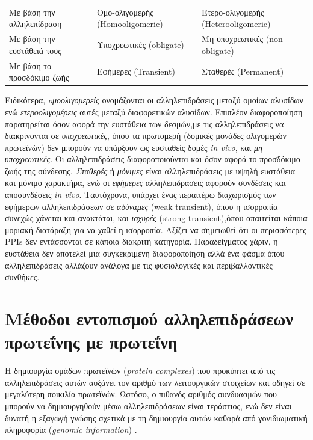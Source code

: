 \medskip
\begingroup
\begin{tabularx}{0.8\textwidth} { 
  | >{\raggedright\arraybackslash}X 
  | >{\centering\arraybackslash}X 
  | >{\raggedleft\arraybackslash}X | }
  \hline
 \multicolumn{3}{|c|}{Τύποι Αλληλεπιδράσεων Πρωτεΐνης με Πρωτεΐνη} \\
 \hline
    Με βάση την αλληλεπίδραση & Ομο-ολιγομερής (Homooligomeric) & Ετερο-ολιγομερής (Heterooligomeric)\\
 \hline
    Με βάση την ευστάθειά τους & Υποχρεωτικές (obligate) & Μη υποχρεωτικές (non obligate) \\
 \hline
    Με βάση το προσδόκιμο ζωής & Εφήμερες (Transient) & Σταθερές (Permanent) \\
 \hline
\end{tabularx}
\label{Τύποι Αλληλεπιδράσεων Πρωτεΐνης με Πρωτεΐνη}
\endgroup

\medskip
Ειδικότερα, \textit{oμοολιγομερείς} ονομάζονται οι αλληλεπιδράσεις μεταξύ ομοίων αλυσίδων ενώ \textit{ετεροολιγομέρεις} αυτές μεταξύ διαφορετικών αλυσίδων. Επιπλέον διαφοροποίηση παρατηρείται όσον αφορά την ευστάθεια των δεσμών,με τις αλληλεπιδράσεις να διακρίνονται σε \textit{υποχρεωτικές}, όπου τα πρωτομερή (δομικές μονάδες ολιγομερών πρωτεϊνών) δεν μπορούν να υπάρξουν ως ευσταθείς δομές \textit{in vivo}, και \textit{μη υποχρεωτικές}. Οι αλληλεπιδράσεις διαφοροποιούνται και όσον αφορά το προσδόκιμο ζωής της σύνδεσης. \textit{Σταθερές} ή \textit{μόνιμες} είναι αλληλεπιδράσεις με υψηλή ευστάθεια και μόνιμο χαρακτήρα, ενώ οι \textit{εφήμερες} αλληλεπιδράσεις αφορούν συνδέσεις και αποσυνδέσεις \textit{in vivo}. Ταυτόχρονα, υπάρχει ένας περαιτέρω διαχωρισμός των εφήμερων αλληλεπιδράσεων σε \textit{αδύναμες} (weak transient), όπου η ισορροπία συνεχώς χάνεται και ανακτάται, και \textit{ισχυρές} (strong transient),όπου απαιτείται κάποια μοριακή διατάραξη για να χαθεί η ισορροπία\cite{Nooren2003}. Αξίζει να σημειωθεί ότι οι περισσότερες PPIs δεν εντάσσονται σε κάποια διακριτή κατηγορία. Παραδείγματος χάριν, η ευστάθεια δεν αποτελεί μια συγκεκριμένη διαφοροποίηση αλλά ένα φάσμα όπου αλληλεπιδράσεις αλλάζουν ανάλογα με τις φυσιολογικές και περιβαλλοντικές συνθήκες.

\section{Μέθοδοι εντοπισμού αλληλεπιδράσεων πρωτεΐνης με πρωτεΐνη}

Η δημιουργία ομάδων πρωτεϊνών (\textit{protein complexes}) που προκύπτει από τις αλληλεπιδράσεις αυτών αυξάνει τον αριθμό των λειτουργικών στοιχείων και οδηγεί σε μεγαλύτερη ποικιλία πρωτεϊνών. Ωστόσο, ο πιθανός αριθμός συνδυασμών που μπορούν να δημιουργηθούν μέσω αλληλεπιδράσεων είναι τεράστιος, ενώ δεν είναι δυνατή η εξαγωγή γνώσης σχετικά με τη δημιουργία αυτών καθαρά από γονιδιωματική πληροφορία (\textit{genomic information}) \cite{Miura2018}.

